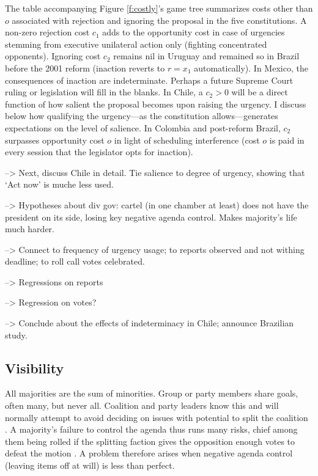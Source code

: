 \documentclass[letter,12pt]{article}
\begin{document}
The table accompanying Figure \ref{f:costly}'s game tree summarizes costs other than $o$ associated with rejection and ignoring the proposal in the five constitutions. A non-zero rejection cost $c_1$ adds to the opportunity cost in case of urgencies stemming from executive unilateral action only (fighting concentrated opponents). Ignoring cost $c_2$ remains nil in Uruguay and remained so in Brazil before the 2001 reform (inaction reverts to $r=x_1$ automatically). In Mexico, the consequences of inaction are indeterminate. Perhaps a future Supreme Court ruling or legislation will fill in the blanks. In Chile, a $c_2>0$ will be a direct function of how salient the proposal becomes upon raising the urgency. I discuss below how qualifying the urgency---as the constitution allows---generates expectations on the level of salience. In Colombia and post-reform Brazil, $c_2$ surpasses opportunity cost $o$ in light of scheduling interference (cost $o$ is paid in every session that the legislator opts for inaction). 

--> Next, discuss Chile in detail. Tie salience to degree of urgency, showing that `Act now' is muche less used. 

--> Hypotheses about div gov: cartel (in one chamber at least) does not have the president on its side, losing key negative agenda control. Makes majority's life much harder. 

--> Connect to frequency of urgency usage; to reports observed and not withing deadline; to roll call votes celebrated. 

--> Regressions on reports

--> Regression on votes?

--> Conclude about the effects of indeterminacy in Chile; announce Brazilian study.

\subsection{Visibility}

All majorities are the sum of minorities. Group or party members share goals, often many, but never all. Coalition and party leaders know this and will normally attempt to avoid deciding on issues with potential to split the coalition \citep{riker.1986,shepsle.2003}. A majority's failure to control the agenda thus runs many risks, chief among them being rolled if the splitting faction gives the opposition enough votes to defeat the motion \citep{cox.mccubbins.2005}. A problem therefore arises when negative agenda control (leaving items off at will) is less than perfect. 
\end{document}
